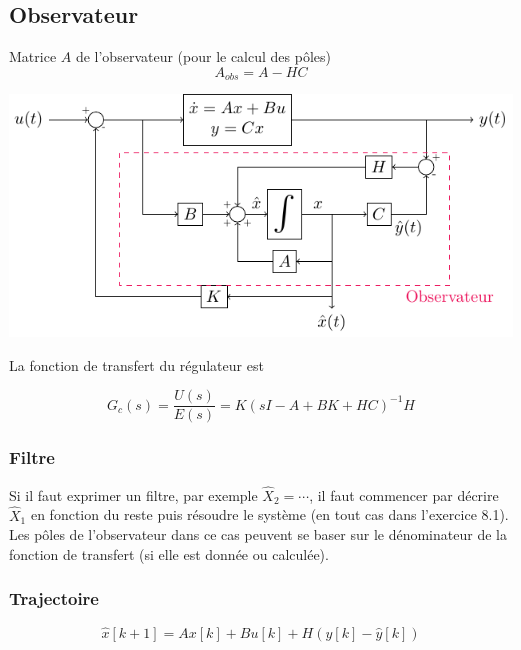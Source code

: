 \documentclass[resume]{subfiles}
\begin{document}
\subsection{Observateur}
Matrice $A$ de l'observateur (pour le calcul des pôles)
$$A_{obs}=A-HC$$
\begin{center}
\includegraphics[width=\columnwidth]{drwg_5.pdf}
\end{center}
La fonction de transfert du régulateur est

$$G_c(s)=\frac{U(s)}{E(s)}=K\left(sI-A+BK+HC\right)^{-1}H$$


\subsubsection{Filtre}
Si il faut exprimer un filtre, par exemple $\hat{X}_2=\cdots$, il faut commencer par décrire $\hat{X}_1$ en fonction du reste puis résoudre le système (en tout cas dans l'exercice 8.1).\\
Les pôles de l'observateur dans ce cas peuvent se baser sur le dénominateur de la fonction de transfert (si elle est donnée ou calculée).

\subsubsection{Trajectoire}
$$\boxed{\hat{x}[k+1]=Ax[k] + Bu[k] + H\left(y[k] - \hat{y}[k]\right)}$$
\end{document}
